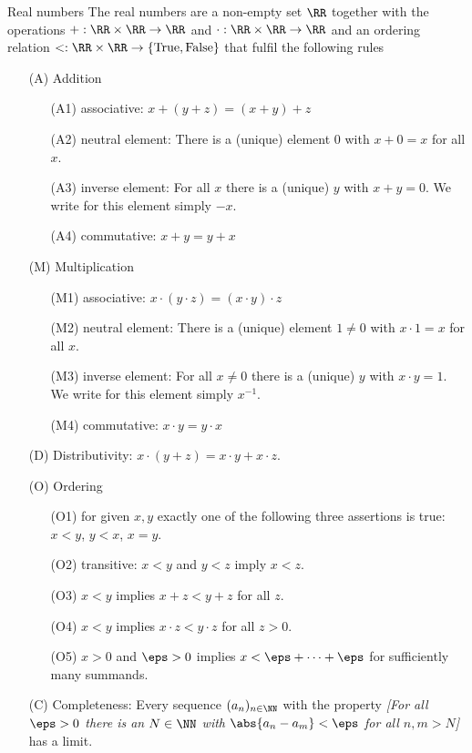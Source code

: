 \white{3cm}{
}








\begin{Addinfo}{Real numbers}
The real numbers are a non-empty set $\RR$
together with the operations $+ : \RR \times \RR \rightarrow \RR$
and  $\cdot : \RR \times \RR \rightarrow \RR$
and an ordering relation $<: \RR \times \RR \rightarrow \{\text{True}, \text{False}\}$
that fulfil the following rules
\begin{enumerate}
	\item[(A)] Addition
	\begin{enumerate}[(1)]
		\item[(A1)]  associative: $x + (y + z) = (x + y) + z$
		\item[(A2)]  neutral element: There is a (unique) element $0$
		with $x + 0 = x$ for all $x$.
		\item[(A3)]  inverse element: For all $x$ there is a (unique) $y$
		with $x + y = 0$. We write for this element simply $-x$.
		\item[(A4)]  commutative: $x + y = y + x$
	\end{enumerate}
 	\item[(M)]  Multiplication
	\begin{enumerate}[(1)]
		\item[(M1)] associative: $x \cdot (y \cdot z) = (x \cdot y) \cdot z$
		\item[(M2)] neutral element: There is a (unique) element $1 \! \neq \! 0$
		with $x \! \cdot \! 1 = x$ for all $x$.
		\item[(M3)] inverse element: For all $x \neq 0$ there is a (unique) $y$
		with $x \cdot y = 1$. We write for this element simply $x^{-1}$.
		\item[(M4)] commutative: $x \cdot y = y \cdot x$
	\end{enumerate}
	\item[(D)]  Distributivity: $x \cdot (y + z) = x \cdot y + x \cdot z$.
	\item[(O)]  Ordering
		\begin{enumerate}[(1)]
			\item[(O1)] for given $x,y$ exactly one of the following three
			assertions is true: $x<y$, $y<x$, $x=y$.
			\item[(O2)] transitive: $x<y$ and $y<z$ imply $x<z$.
			\item[(O3)] $x < y$ implies $x + z < y + z$ for all $z$.
			\item[(O4)] $x < y$ implies $x \cdot z < y \cdot z$ for all $z>0$.
			\item[(O5)] $x>0$ and $\eps>0$ implies $x < \eps + \cdots + \eps$ for
			sufficiently many summands.
		\end{enumerate}
	\item[(C)]  Completeness: Every sequence $(a_n)_{n\in \NN}$ with the
	property \emph{[For all $\eps > 0$ there is an $N \in \NN$
	with $\abs{a_n - a_m} < \eps$ for all $n,m > N$]} has a limit.
\end{enumerate}
\end{Addinfo}



